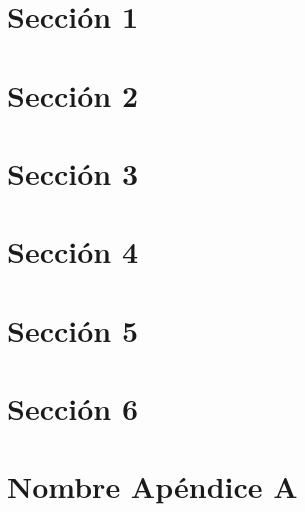 \documentclass[11pt]{article}
\begin{document}

\newpage
\newpage
\pagestyle{empty}
\renewcommand{\contentsname}{{\textit{\huge Índice}}} %
\tableofcontents

\newpage
\pagestyle{empty}
\renewcommand{\listfigurename}{{\textit{\huge Lista de figuras}}}
\listoffigures

\newpage
\pagestyle{fancy} %
\setcounter{page}{1} %
\seteocontadores
\section{Sección 1}


\newpage
\seteocontadores
\section{Sección 2}


\newpage
\seteocontadores
\section{Sección 3}


\newpage
\seteocontadores
\section{Sección 4}


\newpage
\seteocontadores
\section{Sección 5}


\newpage
\seteocontadores
\section{Sección 6}



\appendix %
\clearpage
\newpage
{} %
\def \nombreapendice{A} %
\formatoapendice %
\seteocontadores %
\section{Nombre Apéndice A}\label{ApendiceA} %

\end{document}
